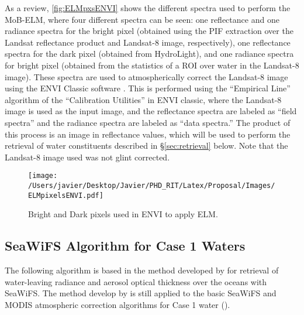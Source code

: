 
As a review, \autoref{fig:ELMpxsENVI} shows the different spectra used to perform the MoB-ELM, where four different spectra can be seen: one reflectance and one radiance spectra for the bright pixel (obtained using the PIF extraction over the Landsat reflectance product and Landsat-8 image, respectively), one reflectance spectra for the dark pixel (obtained from HydroLight), and one radiance spectra for bright pixel (obtained from the statistics of a ROI over water in the Landsat-8 image). These spectra are used to atmospherically correct the Landsat-8 image using the ENVI Classic software \cite{ENVIUserGuide}. This is performed using the ``Empirical Line'' algorithm of the ``Calibration Utilities'' in ENVI classic, where the Landsat-8 image is used as the input image, and the reflectance spectra are labeled as ``field spectra'' and the radiance spectra are labeled as ``data spectra.'' The product of this process is an image in reflectance values, which will be used to perform the retrieval of water constituents described in \S\ref{sec:retrieval} below. Note that the Landsat-8 image used was not glint corrected.

\begin{figure}[htb]
  \centering
  \texttt{[image: /Users/javier/Desktop/Javier/PHD\_RIT/Latex/Proposal/Images/ELMpixelsENVI.pdf]}
  \caption{Bright and Dark pixels used in ENVI to apply ELM. \label{fig:ELMpxsENVI} } 
\end{figure}

\subsection{SeaWiFS Algorithm for Case 1 Waters}
\label{subsec:gordon}
The following algorithm is based in the method developed by \cite{Gordon:1994} for retrieval of water-leaving radiance and aerosol optical thickness over the oceans with SeaWiFS. The method develop by \cite{Gordon:1994} is still applied to the basic SeaWiFS and MODIS atmospheric correction algorithms for Case 1 water (\cite{IOCCG:2010}).

